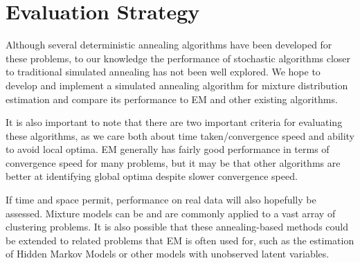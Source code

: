 \documentclass{article}
\theoremstyle{definition}
\begin{document}
\section{Evaluation Strategy}

Although several deterministic annealing algorithms have been developed for these problems, to our knowledge the performance of stochastic algorithms closer to traditional simulated annealing has not been well explored. We hope to develop and implement a simulated annealing algorithm for mixture distribution estimation and compare its performance to EM and other existing algorithms.

It is also important to note that there are two important criteria for evaluating these algorithms, as we care both about time taken/convergence speed and ability to avoid local optima. EM generally has fairly good performance in terms of convergence speed for many problems, but it may be that other algorithms are better at identifying global optima despite slower convergence speed.

If time and space permit, performance on real data will also hopefully be assessed. Mixture models can be and are commonly applied to a vast array of clustering problems. It is also possible that these annealing-based methods could be extended to related problems that EM is often used for, such as the estimation of Hidden Markov Models or other models with unobserved latent variables.




\end{document}
